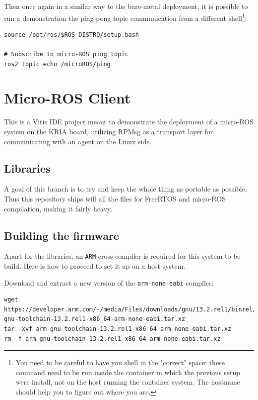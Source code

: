 \documentclass[10pt]{article}
\begin{document}
Then once again in a similar way to the bare-metal deployment,  it is possible to run a demonstration
the ping-pong topic communication from a different shell\footnote{You need to be careful to have you shell in the "correct" space: these command need to be run inside
the container in which the previous setup were install, not on the host running the container system.
The hostname should help you to figure out where you are.}:
\begin{verbatim}
source /opt/ros/$ROS_DISTRO/setup.bash

# Subscribe to micro-ROS ping topic
ros2 topic echo /microROS/ping
\end{verbatim}
\clearpage
\section{Micro-ROS Client}
\label{sec:org9372322}
This is a Vitis IDE project meant to demonstrate the deployment of a micro-ROS system
on the KRIA board, utilizing RPMsg as a transport layer for communicating
with an agent on the Linux side.

\subsection{Libraries}
\label{sec:org4d63c88}
A goal of this branch is to try and keep the whole thing as portable as possible.
Thus this repository ships will all the files for FreeRTOS and micro-ROS compilation,
making it fairly heavy.

\subsection{Building the firmware}
\label{sec:org9ac93b0}
Apart for the libraries, an \texttt{ARM} cross-compiler is required for this system to be
build. Here is how to proceed to set it up on a host system.

Download and extract a new version of the \texttt{arm-none-eabi} compiler:
\begin{verbatim}
wget https://developer.arm.com/-/media/Files/downloads/gnu/13.2.rel1/binrel/arm-gnu-toolchain-13.2.rel1-x86_64-arm-none-eabi.tar.xz
tar -xvf arm-gnu-toolchain-13.2.rel1-x86_64-arm-none-eabi.tar.xz
rm -f arm-gnu-toolchain-13.2.rel1-x86_64-arm-none-eabi.tar.xz
\end{verbatim}
\end{document}
